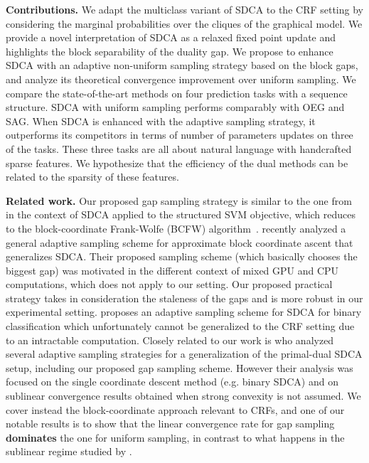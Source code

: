\textbf{Contributions.} We adapt the multiclass variant of SDCA to the CRF setting by considering the marginal probabilities over the cliques of the graphical model.
We provide a novel interpretation of SDCA as a relaxed fixed point update and highlights the block separability of the duality gap.
We propose to enhance SDCA with an adaptive non-uniform sampling strategy based on the block gaps, and analyze its theoretical convergence improvement over uniform sampling.
We compare the state-of-the-art methods on four prediction tasks with a sequence structure.
SDCA with uniform sampling performs comparably with OEG and SAG.
When SDCA is enhanced with the adaptive sampling strategy, it outperforms its competitors in terms of number of parameters updates on three of the tasks.
These three tasks are all about natural language with handcrafted sparse features.
We hypothesize that the efficiency of the dual methods can be related to the sparsity of these features.

\textbf{Related work.}
Our proposed gap sampling strategy is similar to the one from~\citet{osokin2016minding} in the context of SDCA applied to the structured SVM objective, which reduces to the block-coordinate Frank-Wolfe (BCFW) algorithm~\citep{lacoste2013block}.
\citet{dunner2017efficient} recently analyzed a general adaptive sampling scheme for approximate block coordinate ascent that generalizes SDCA.
Their proposed sampling scheme (which basically chooses the biggest gap) was motivated in the different context of mixed GPU and CPU computations, which does not apply to our setting.
Our proposed practical strategy takes in consideration the staleness of the gaps and is more robust in our experimental setting.
\citet{csiba2015stochastic} proposes an adaptive sampling scheme for SDCA for binary classification which unfortunately cannot be generalized to the CRF setting due to an intractable computation. Closely related to our work is \citet{perekrestenko17a} who analyzed several adaptive sampling strategies for a generalization of the primal-dual SDCA setup, including our proposed gap sampling scheme. However their analysis was focused on the single coordinate descent method (e.g. binary SDCA) and on sublinear convergence results obtained when strong convexity is not assumed. We cover instead the block-coordinate approach relevant to CRFs, and one of our notable results is to show that the linear convergence rate for gap sampling \textbf{dominates} the one for uniform sampling, in contrast to what happens in the sublinear regime studied by \citet{perekrestenko17a}. 

